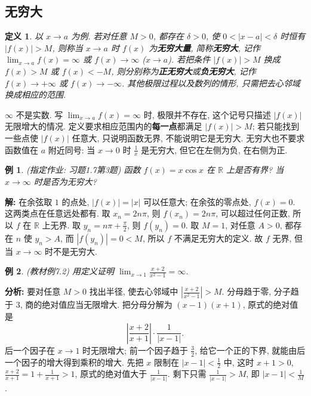 \documentclass[UTF8,openany]{ctexbook}
\theoremstyle{chinesetextbook}
\newtheorem{definition}{定义}[section]
\newtheorem{example}{例}[section]
\newenvironment{cnsolution}{\par\indent\textbf{解:} \ignorespaces}{\par}
\begin{document}
\subsection{无穷大}
\begin{definition}
以 $x\to a$ 为例. 若对任意 $M>0$, 都存在 $\delta>0$, 使 $0<|x-a|<\delta$ 时恒有 $|f(x)|>M$, 则称当 $x\to a$ 时 $f(x)$ 为\textbf{无穷大量}, 简称\textbf{无穷大}, 记作 $\displaystyle\lim_{x\to a}f(x)=\infty$ 或 $f(x)\to\infty$ ($x\to a$). 若把条件 $|f(x)|>M$ 换成 $f(x)>M$ 或 $f(x)<-M$, 则分别称为\textbf{正无穷大}或\textbf{负无穷大}, 记作 $f(x)\to+\infty$ 或 $f(x)\to-\infty$. 其他极限过程以及数列的情形, 只需把去心邻域换成相应的范围.
\end{definition}
$\infty$ 不是实数. 写 $\displaystyle\lim_{x\to a}f(x)=\infty$ 时, 极限并不存在, 这个记号只描述 $|f(x)|$ 无限增大的情况. 定义要求相应范围内的\textbf{每一点}都满足 $|f(x)|>M$; 若只能找到一些点使 $|f(x)|$ 任意大, 只说明函数无界, 不能说明它是无穷大. 无穷大也不要求函数值在 $a$ 附近同号: 当 $x\to0$ 时 $\displaystyle\frac1x$ 是无穷大, 但它在左侧为负, 在右侧为正.
\begin{example}
\textnormal{(指定作业: 习题1.7第3题)} 函数 $f(x)=x\cos x$ 在 $\mathbb R$ 上是否有界? 当 $x\to\infty$ 时是否为无穷大?
\end{example}
\begin{cnsolution}
在余弦取 $1$ 的点处, $|f(x)|=|x|$ 可以任意大; 在余弦的零点处, $f(x)=0$. 这两类点在任意远处都有. 取 $x_n=2n\pi$, 则 $f(x_n)=2n\pi$, 可以超过任何正数, 所以 $f$ 在 $\mathbb R$ 上无界. 取 $\displaystyle y_n=n\pi+\frac\pi2$, 则 $f(y_n)=0$. 取 $M=1$, 对任意 $A>0$, 都存在 $n$ 使 $y_n>A$, 而 $|f(y_n)|=0<M$, 所以 $f$ 不满足无穷大的定义. 故 $f$ 无界, 但当 $x\to\infty$ 时不是无穷大.
\end{cnsolution}
\begin{example}
\textnormal{(教材例7.2)} 用定义证明 $\displaystyle\lim_{x\to1}\frac{x+2}{x^2-1}=\infty$.
\end{example}
\par\indent\textbf{分析:} 要对任意 $M>0$ 找出半径, 使去心邻域中 $\displaystyle\left|\frac{x+2}{x^2-1}\right|>M$. 分母趋于零, 分子趋于 $3$, 商的绝对值应当无限增大. 把分母分解为 $(x-1)(x+1)$, 原式的绝对值是
\[
\left|\frac{x+2}{x+1}\right|\cdot\frac1{|x-1|}.
\]
后一个因子在 $x\to1$ 时无限增大; 前一个因子趋于 $\displaystyle\frac32$, 给它一个正的下界, 就能由后一个因子的增大得到乘积的增大. 先把 $x$ 限制在 $\displaystyle|x-1|<\frac12$ 中, 这时 $x+1>0$, $\displaystyle\frac{x+2}{x+1}=1+\frac1{x+1}>1$, 原式的绝对值大于 $\displaystyle\frac1{|x-1|}$. 剩下只需 $\displaystyle\frac1{|x-1|}>M$, 即 $\displaystyle|x-1|<\frac1M$.
\end{document}
